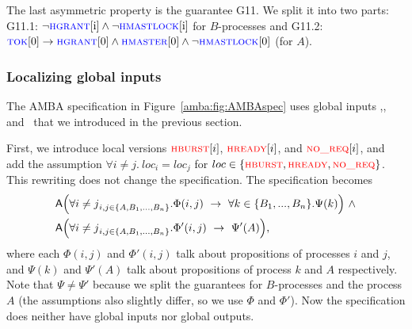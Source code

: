   The last asymmetric property is the guarantee G11. We split it into two parts:
  \li
  \- G11.1: $\neg \textsc{\textcolor{blue}{hgrant}}[\textrm{i}] \land \neg \textsc{\textcolor{blue}{hmastlock}}[\textrm{i}]$ for $B$-processes and
  \- G11.2: $\textsc{\textcolor{blue}{tok}}[0] \rightarrow \textsc{\textcolor{blue}{hgrant}}[0] \land \textsc{\textcolor{blue}{hmaster}}[0] \land \neg \textsc{\textcolor{blue}{hmastlock}}[0]$ (for $A$).
  \il

\subsubsection{Localizing global inputs}

  The AMBA specification in Figure~\ref{amba:fig:AMBAspec} uses global inputs \hburst,\hready,
  and \norequests\ that we introduced in the previous section.

  First, we introduce local versions $\textsc{\textcolor{red}{hburst}}[i]$, $\textsc{\textcolor{red}{hready}}[i]$, and $\textsc{\textcolor{red}{no\_req}}[i]$,
  and add the assumption $\forall i\neq j.\ loc_i = loc_j$ for $loc \in \{\textsc{\textcolor{red}{hburst}}, \textsc{\textcolor{red}{hready}},\textsc{\textcolor{red}{no\_req}}\}$.
  This rewriting does not change the specification.
  The specification becomes
  \begin{align*}
  &{\operatorname{\mathsf{A}}}\Big(\forall{i \neq j}_{i,j \in \{A,B_1,...,B_n\}}. \Phi({i,j}) ~\rightarrow~ \forall{k \in \{B_1,...,B_n\}}. \Psi(k)\Big) ~\land\\
  &{\operatorname{\mathsf{A}}}\Big(\forall{i \neq j}_{i,j \in \{A,B_1,...,B_n\}}. \Phi'({i,j}) ~\rightarrow~ \Psi'(A)\Big),
  \end{align*}
  where each $\Phi(i,j)$ and $\Phi'(i,j)$ talk about propositions of processes $i$ and $j$,
  and $\Psi(k)$ and $\Psi'(A)$ talk about propositions of process $k$ and $A$ respectively.
  Note that $\Psi \neq \Psi'$ because we split the guarantees for $B$-processes and the process $A$
  (the assumptions also slightly differ, so we use $\Phi$ and $\Phi'$).
  Now the specification does neither have global inputs nor global outputs.

